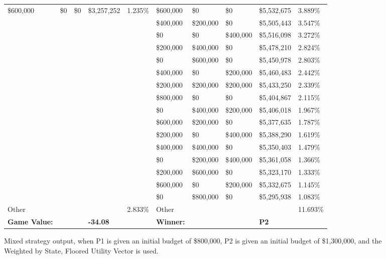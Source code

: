 \documentclass[11pt]{article}
\begin{document}
\begin{figure}
\begin{tabular}{ |p{1.0cm}p{1.0cm}p{1.0cm}p{2.0cm}|p{1.0cm}||p{1.0cm}p{1.0cm}p{1.0cm}p{2.0cm}|p{1.0cm}|}
\$600,000 & \$0 & \$0 & \$3,257,252  & 1.235\%      & \$600,000 & \$0 & \$0 & \$5,532,675  & 3.889\% \\
&&&&                                                & \$400,000& \$200,000 & \$0 & \$5,505,443  & 3.547\% \\
&&&&                                                & \$0 & \$0& \$400,000 & \$5,516,098  & 3.272\% \\
&&&&                                                & \$200,000& \$400,000 & \$0 & \$5,478,210  & 2.824\% \\
&&&&                                                & \$0 & \$600,000 & \$0 & \$5,450,978  & 2.803\% \\
&&&&                                                & \$400,000 & \$0& \$200,000 & \$5,460,483  & 2.442\% \\
&&&&                                                & \$200,000& \$200,000& \$200,000 & \$5,433,250  & 2.339\% \\
&&&&                                                & \$800,000 & \$0 & \$0 & \$5,404,867  & 2.115\% \\
&&&&                                                & \$0& \$400,000& \$200,000 & \$5,406,018  & 1.967\% \\
&&&&                                                & \$600,000& \$200,000 & \$0 & \$5,377,635  & 1.787\% \\
&&&&                                                & \$200,000 & \$0& \$400,000 & \$5,388,290  & 1.619\% \\
&&&&                                                & \$400,000& \$400,000 & \$0 & \$5,350,403  & 1.479\% \\
&&&&                                                & \$0& \$200,000& \$400,000 & \$5,361,058  & 1.366\% \\
&&&&                                                & \$200,000 & \$600,000 & \$0 & \$5,323,170  & 1.333\% \\
&&&&                                                & \$600,000 & \$0& \$200,000 & \$5,332,675  & 1.145\% \\
&&&&                                                & \$0& \$800,000 & \$0 & \$5,295,938  & 1.083\% \\
\hline
Other &&&& 2.833\% & Other &&&& 11.693\% \\
\hline
\small \textbf{Game Value:} &&& \small \textbf{-34.08} && \small \textbf{Winner:} &&& \small \textbf{P2}&\\
\hline
\end{tabular}
\caption{Mixed strategy output, when P1 is given an initial budget of \$800,000, P2 is given an initial budget of \$1,300,000, and the Weighted by State, Floored Utility Vector is used.}
\label{8v13table.2}
\end{figure}
\end{document}
